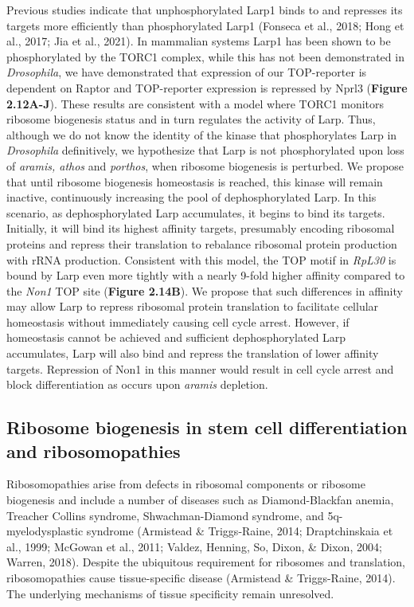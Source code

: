 \documentclass[12pt,oneside]{reedthesis}
\begin{document}
Previous studies indicate that unphosphorylated Larp1 binds to and
represses its targets more efficiently than phosphorylated Larp1
(Fonseca et al., 2018; Hong et al., 2017; Jia et al., 2021). In mammalian systems Larp1 has been shown
to be phosphorylated by the TORC1 complex, while this has not been
demonstrated in \emph{Drosophila}, we have demonstrated that expression of
our TOP-reporter is dependent on Raptor and TOP-reporter expression is
repressed by Nprl3 (\textbf{Figure 2.12A-J}). These results are consistent with
a model where TORC1 monitors ribosome biogenesis status and in turn
regulates the activity of Larp. Thus, although we do not know the
identity of the kinase that phosphorylates Larp in \emph{Drosophila}
definitively, we hypothesize that Larp is not phosphorylated upon loss
of \emph{aramis, athos} and \emph{porthos}, when ribosome biogenesis is perturbed.
We propose that until ribosome biogenesis homeostasis is reached, this
kinase will remain inactive, continuously increasing the pool of
dephosphorylated Larp. In this scenario, as dephosphorylated Larp
accumulates, it begins to bind its targets. Initially, it will bind its
highest affinity targets, presumably encoding ribosomal proteins and
repress their translation to rebalance ribosomal protein production with
rRNA production. Consistent with this model, the TOP motif in \emph{RpL30} is
bound by Larp even more tightly with a nearly 9-fold higher affinity
compared to the \emph{Non1} TOP site (\textbf{Figure 2.14B}). We propose that such
differences in affinity may allow Larp to repress ribosomal protein
translation to facilitate cellular homeostasis without immediately
causing cell cycle arrest. However, if homeostasis cannot be achieved
and sufficient dephosphorylated Larp accumulates, Larp will also bind
and repress the translation of lower affinity targets. Repression of
Non1 in this manner would result in cell cycle arrest and block
differentiation as occurs upon \emph{aramis} depletion.

\hypertarget{ribosome-biogenesis-in-stem-cell-differentiation-and-ribosomopathies}{%
\subsection{Ribosome biogenesis in stem cell differentiation and ribosomopathies}\label{ribosome-biogenesis-in-stem-cell-differentiation-and-ribosomopathies}}

Ribosomopathies arise from defects in ribosomal components or ribosome
biogenesis and include a number of diseases such as Diamond-Blackfan
anemia, Treacher Collins syndrome, Shwachman-Diamond syndrome, and
5q-myelodysplastic syndrome (Armistead \& Triggs-Raine, 2014; Draptchinskaia et al., 1999; McGowan et al., 2011; Valdez, Henning, So, Dixon, \& Dixon, 2004; Warren, 2018).
Despite the ubiquitous requirement for ribosomes and translation,
ribosomopathies cause tissue-specific disease (Armistead \& Triggs-Raine, 2014). The
underlying mechanisms of tissue specificity remain unresolved.
\end{document}
